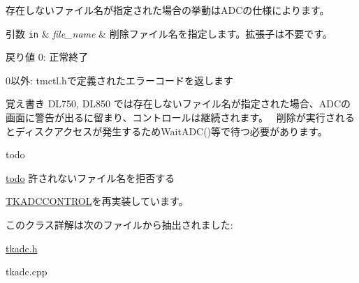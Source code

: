 存在しないファイル名が指定された場合の挙動は\+A\+D\+Cの仕様によります。 
\begin{DoxyParams}[1]{引数}
\mbox{\tt in}  & {\em file\+\_\+name} & 削除ファイル名を指定します。拡張子は不要です。 \\
\hline
\end{DoxyParams}
\begin{DoxyReturn}{戻り値}
0\+: 正常終了 

0以外\+: tmctl.\+hで定義されたエラーコードを返します 
\end{DoxyReturn}
\begin{DoxyNote}{覚え書き}
D\+L750, D\+L850 では存在しないファイル名が指定された場合、\+A\+D\+Cの画面に警告が出るに留まり、コントロールは継続されます。~\newline
 削除が実行されるとディスクアクセスが発生するため\+Wait\+A\+D\+C()等で待つ必要があります。 
\end{DoxyNote}
\begin{DoxyRefDesc}{todo}
\item[\hyperlink{todo__todo000002}{todo}]許されないファイル名を拒否する \end{DoxyRefDesc}


\hyperlink{class_t_k_a_d_c_c_o_n_t_r_o_l_afa385509f61162198950676d279f4c3c}{T\+K\+A\+D\+C\+C\+O\+N\+T\+R\+OL}を再実装しています。



このクラス詳解は次のファイルから抽出されました\+:\begin{DoxyCompactItemize}
\item 
\hyperlink{tkadc_8h}{tkadc.\+h}\item 
tkadc.\+cpp\end{DoxyCompactItemize}
